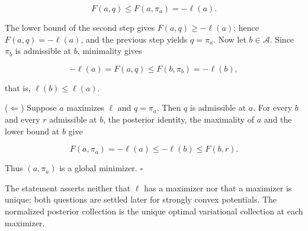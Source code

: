 \documentclass[11pt,a4paper]{report}
\begin{document}
\[F(a,q)\le F(a,\pi_a)=-\ell(a).\]


The lower bound of the second step gives \(F(a,q)\ge-\ell(a)\); hence \(F(a,q)=-\ell(a)\), and the previous step yields \(q=\pi_a\). Now let \(b\in\mathcal A\). Since \(\pi_b\) is admissible at \(b\), minimality gives


\[-\ell(a)=F(a,q)\le F(b,\pi_b)=-\ell(b),\]


that is, \(\ell(b)\le\ell(a)\).




(\(\Leftarrow\)) Suppose \(a\) maximizes \(\ell\) and \(q=\pi_a\). Then \(q\) is admissible at \(a\). For every \(b\) and every \(r\) admissible at \(b\), the posterior identity, the maximality of \(a\) and the lower bound at \(b\) give


\[F(a,\pi_a)=-\ell(a)\le-\ell(b)\le F(b,r).\]


Thus \((a,\pi_a)\) is a global minimizer. \(\square\)




The statement asserts neither that \(\ell\) has a maximizer nor that a maximizer is unique; both questions are settled later for strongly convex potentials. The normalized posterior collection is the unique optimal variational collection at each maximizer.
\end{document}
